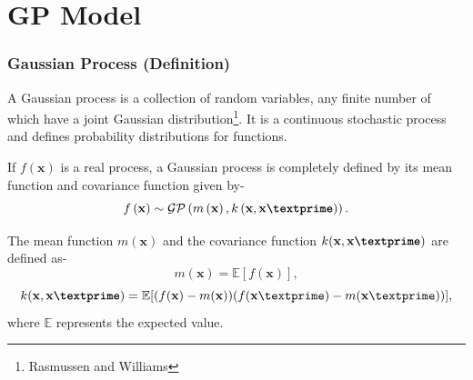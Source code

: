 \documentclass{beamer}
\begin{document}
\section{GP Model}
\begin{frame}
\frametitle{Gaussian Process (Definition)}
A Gaussian process is a collection of random variables, any finite number of which have a joint Gaussian distribution\footnote{Rasmussen and Williams}. It is a continuous stochastic process and defines probability distributions for functions.

If $f(\textbf{x})$ is a real process, a Gaussian process is completely defined by its mean function and covariance function given by-
\begin{equation} \label{eq:GP}
f\left(\textbf{x} \right)\sim \mathcal{GP} \left(m \left(\textbf{x}\right), k \left(\textbf{x},\textbf{x\textprime}\right) \right).
\end{equation}

The mean function $m(\textbf{x})$  and the covariance function $k(\textbf{x},\textbf{x\textprime})$ are defined as-
\begin{equation} \label{eq:2.3}
m(\textbf{x})= \mathbb{E}[f(\textbf{x})],
\end{equation}
\begin{equation} \label{eq:2.4}
k(\textbf{x},\textbf{x\textprime})= 
\mathbb{E}[(f(\textbf{x})-m(\textbf{x}))(f(\textbf{x}\textprime)-m(\textbf{x}\textprime))],
\end{equation}
where $\mathbb{E}$ represents the expected value.

\end{frame}

\end{document}
